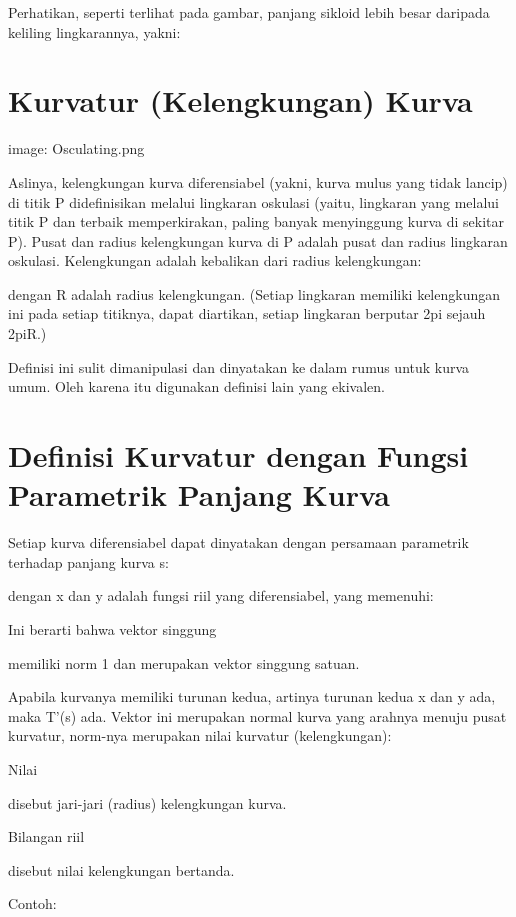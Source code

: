 \documentclass[
]{book}
\begin{document}
Perhatikan, seperti terlihat pada gambar, panjang sikloid lebih besar daripada keliling lingkarannya, yakni:

\section{Kurvatur (Kelengkungan) Kurva}\label{kurvatur-kelengkungan-kurva}

image: Osculating.png

Aslinya, kelengkungan kurva diferensiabel (yakni, kurva mulus yang tidak lancip) di titik P didefinisikan melalui lingkaran oskulasi (yaitu, lingkaran yang melalui titik P dan terbaik memperkirakan, paling banyak menyinggung kurva di sekitar P). Pusat dan radius kelengkungan kurva di P adalah pusat dan radius lingkaran oskulasi. Kelengkungan adalah kebalikan dari radius kelengkungan:

dengan R adalah radius kelengkungan. (Setiap lingkaran memiliki kelengkungan ini pada setiap titiknya, dapat diartikan, setiap lingkaran berputar 2pi sejauh 2piR.)

Definisi ini sulit dimanipulasi dan dinyatakan ke dalam rumus untuk kurva umum. Oleh karena itu digunakan definisi lain yang ekivalen.

\section{Definisi Kurvatur dengan Fungsi Parametrik Panjang Kurva}\label{definisi-kurvatur-dengan-fungsi-parametrik-panjang-kurva}

Setiap kurva diferensiabel dapat dinyatakan dengan persamaan parametrik terhadap panjang kurva s:

dengan x dan y adalah fungsi riil yang diferensiabel, yang memenuhi:

Ini berarti bahwa vektor singgung

memiliki norm 1 dan merupakan vektor singgung satuan.

Apabila kurvanya memiliki turunan kedua, artinya turunan kedua x dan y ada, maka T'(s) ada. Vektor ini merupakan normal kurva yang arahnya menuju pusat kurvatur, norm-nya merupakan nilai kurvatur (kelengkungan):

Nilai

disebut jari-jari (radius) kelengkungan kurva.

Bilangan riil

disebut nilai kelengkungan bertanda.

Contoh:
\end{document}
